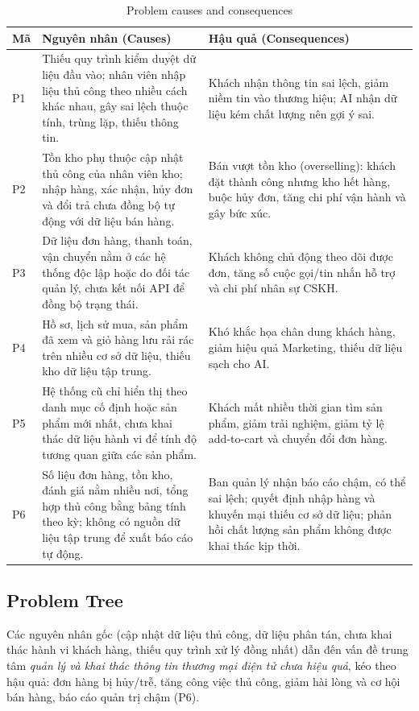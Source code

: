 \documentclass[12pt,a4paper,oneside]{report}
\begin{document}
\begin{longtable}{p{1.0cm}p{7.6cm}p{7.2cm}}
\caption{Problem causes and consequences}\\
\toprule
\textbf{Mã} & \textbf{Nguyên nhân (Causes)} & \textbf{Hậu quả (Consequences)} \\
\midrule
\endhead
\bottomrule
\endlastfoot
P1 & Thiếu quy trình kiểm duyệt dữ liệu đầu vào; nhân viên nhập liệu thủ công theo nhiều cách khác nhau, gây sai lệch thuộc tính, trùng lặp, thiếu thông tin. & Khách nhận thông tin sai lệch, giảm niềm tin vào thương hiệu; AI nhận dữ liệu kém chất lượng nên gợi ý sai. \\
P2 & Tồn kho phụ thuộc cập nhật thủ công của nhân viên kho; nhập hàng, xác nhận, hủy đơn và đổi trả chưa đồng bộ tự động với dữ liệu bán hàng. & Bán vượt tồn kho (overselling): khách đặt thành công nhưng kho hết hàng, buộc hủy đơn, tăng chi phí vận hành và gây bức xúc. \\
P3 & Dữ liệu đơn hàng, thanh toán, vận chuyển nằm ở các hệ thống độc lập hoặc do đối tác quản lý, chưa kết nối API để đồng bộ trạng thái. & Khách không chủ động theo dõi được đơn, tăng số cuộc gọi/tin nhắn hỗ trợ và chi phí nhân sự CSKH. \\
P4 & Hồ sơ, lịch sử mua, sản phẩm đã xem và giỏ hàng lưu rải rác trên nhiều cơ sở dữ liệu, thiếu kho dữ liệu tập trung. & Khó khắc họa chân dung khách hàng, giảm hiệu quả Marketing, thiếu dữ liệu sạch cho AI. \\
P5 & Hệ thống cũ chỉ hiển thị theo danh mục cố định hoặc sản phẩm mới nhất, chưa khai thác dữ liệu hành vi để tính độ tương quan giữa các sản phẩm. & Khách mất nhiều thời gian tìm sản phẩm, giảm trải nghiệm, giảm tỷ lệ add-to-cart và chuyển đổi đơn hàng. \\
P6 & Số liệu đơn hàng, tồn kho, đánh giá nằm nhiều nơi, tổng hợp thủ công bằng bảng tính theo kỳ; không có nguồn dữ liệu tập trung để xuất báo cáo tự động. & Ban quản lý nhận báo cáo chậm, có thể sai lệch; quyết định nhập hàng và khuyến mại thiếu cơ sở dữ liệu; phản hồi chất lượng sản phẩm không được khai thác kịp thời. \\
\end{longtable}

\subsection{Problem Tree}

Các nguyên nhân gốc (cập nhật dữ liệu thủ công, dữ liệu phân tán, chưa khai thác hành vi khách hàng, thiếu quy trình xử lý đồng nhất) dẫn đến vấn đề trung tâm \emph{quản lý và khai thác thông tin thương mại điện tử chưa hiệu quả}, kéo theo hậu quả: đơn hàng bị hủy/trễ, tăng công việc thủ công, giảm hài lòng và cơ hội bán hàng, báo cáo quản trị chậm (P6).
\end{document}
